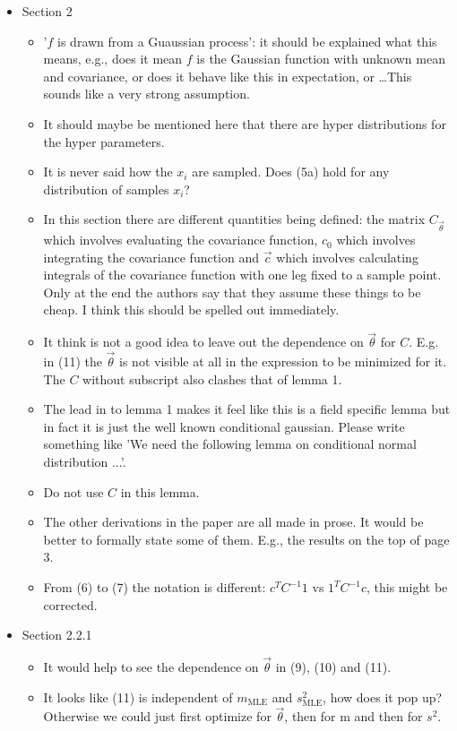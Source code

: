 \documentclass{amsart}
\begin{document}
\begin{itemize}
\item Section 2
\begin{itemize}
\item '$f$ is drawn from a Guaussian process': it should be explained what this
means, e.g., does it mean $f$ is the Gaussian function with unknown mean and
covariance, or does it behave like this in expectation, or \ldots This sounds like
a very strong assumption.
\item It should maybe be mentioned here that there are hyper distributions for the
hyper parameters.
\item It is never said how the $x_i$ are sampled. Does (5a) hold for any
distribution of samples $x_i$?
\item In this section there are different quantities being defined: the matrix
$C_{\vec{\theta}}$ which involves evaluating the covariance function, $c_0$ which
involves integrating the covariance function and $\vec{c}$ which involves
calculating integrals of the covariance function with one leg fixed to a sample
point. Only at the end the authors say that they assume these things to be
cheap. I think this should be spelled out immediately.
\item  It think is not a good idea to leave out the dependence on $\vec{\theta}$ for
$C$. E.g. in (11) the $\vec{\theta}$ is not visible at all in the expression to be
minimized for it. The $C$ without subscript also clashes that of lemma 1.
\item  The lead in to lemma 1 makes it feel like this is a field specific lemma but
in fact it is just the well known conditional gaussian. Please write something
like 'We need the following lemma on conditional normal distribution ...'.
\item  Do not use $C$ in this lemma.
\item  The other derivations in the paper are all made in prose. It would be better
to formally state some of them. E.g., the results on the top of page 3.
\item  From (6) to (7) the notation is different: $c^T C^{-1} 1$ vs $1^T C^{-1} c$,
this might be corrected.
\end{itemize}


\item Section 2.2.1
\begin{itemize}
\item It would help to see the dependence on $\vec{\theta}$ in (9), (10) and (11).
\item It looks like (11) is independent of $m_{\text{MLE}}$ and $s^2_{\text{MLE}}$, how does it pop up?
Otherwise we could just first optimize for $\vec{\theta}$, then for m and then
for $s^2$.
\end{itemize}


\end{itemize}
\end{document}
